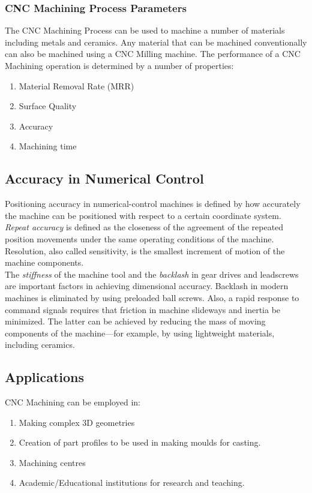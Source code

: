 \subsubsection{CNC Machining Process Parameters}
The CNC Machining Process can be used to machine a number of materials including metals and ceramics. Any material that can be machined conventionally can also be machined using a CNC Milling machine.
The performance of a CNC Machining operation is determined by a number of properties\cite{Kalpakjian2010}:
\begin{enumerate}
	\item Material Removal Rate (MRR)
	\item Surface Quality
	\item Accuracy
	\item Machining time
\end{enumerate}
\subsection{Accuracy in Numerical Control}
Positioning accuracy in numerical-control machines is defined by how accurately the machine can be positioned with respect to a certain coordinate system. \textit{Repeat accuracy} is defined as the closeness of the agreement of the repeated position movements under the same operating conditions of the machine. Resolution, also called sensitivity, is the smallest increment of motion of the machine components.\\
The \textit{stiffness} of the machine tool and the \textit{backlash} in gear drives and leadscrews are important factors in achieving dimensional accuracy. Backlash in modern machines is eliminated by using preloaded ball screws. Also, a rapid response to command signals requires that friction in machine slideways and inertia be minimized. The latter can be achieved by reducing the mass of moving components of the machine—for example, by using lightweight materials, including ceramics.
\newpage
\subsection{Applications}
CNC Machining can be employed in:
\begin{enumerate}
	\item Making complex 3D geometries
	\item Creation of part profiles to be used in making moulds for casting.
	\item Machining centres
	\item Academic/Educational institutions for research and teaching.
\end{enumerate}

